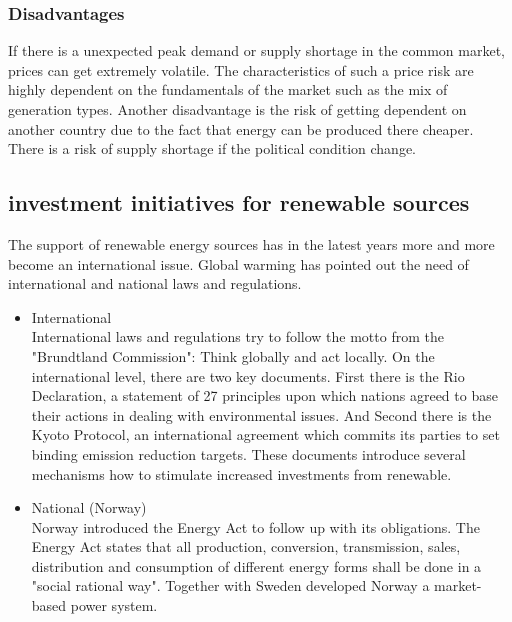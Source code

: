 \documentclass{article}
\begin{document}
\subsubsection{Disadvantages}
If there is a unexpected peak demand or supply shortage in the common market, prices can get extremely volatile. The characteristics of such a price risk are highly dependent on the fundamentals of the market such as the mix of generation types. Another disadvantage is the risk of getting dependent on another country due to the fact that energy can be produced there cheaper. There is a risk of supply shortage if the political condition change.
\subsection{investment initiatives for renewable sources}
The support of renewable energy sources has in the latest years more and more become an international issue. Global warming has pointed out the need of international and national laws and regulations.
\begin{itemize}
\item International\\
International laws and regulations try to follow the motto from the "Brundtland Commission": Think globally and act locally.  On the international level, there are two key documents. First there is the Rio Declaration, a statement of 27 principles upon which nations agreed to base their actions in dealing with environmental issues. And Second there is the Kyoto Protocol, an international agreement which commits its parties to set binding emission reduction targets. These documents introduce several mechanisms how to stimulate increased investments from renewable.
\item National (Norway)\\
Norway introduced the Energy Act to follow up with its obligations. The Energy Act states that all production, conversion, transmission, sales, distribution and consumption of different energy forms shall be done in a "social rational way". Together with Sweden developed Norway a market-based power system.
\end{itemize}
\end{document}
